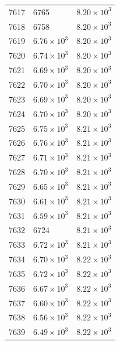 \begin{table}[H]
\begin{tabular}{lll}
7617 & 6765 & $\displaystyle 8.20 \times 10^{3}$ \\
7618 & 6758 & $\displaystyle 8.20 \times 10^{3}$ \\
7619 & $\displaystyle 6.76 \times 10^{3}$ & $\displaystyle 8.20 \times 10^{3}$ \\
7620 & $\displaystyle 6.74 \times 10^{3}$ & $\displaystyle 8.20 \times 10^{3}$ \\
7621 & $\displaystyle 6.69 \times 10^{3}$ & $\displaystyle 8.20 \times 10^{3}$ \\
7622 & $\displaystyle 6.70 \times 10^{3}$ & $\displaystyle 8.20 \times 10^{3}$ \\
7623 & $\displaystyle 6.69 \times 10^{3}$ & $\displaystyle 8.20 \times 10^{3}$ \\
7624 & $\displaystyle 6.70 \times 10^{3}$ & $\displaystyle 8.20 \times 10^{3}$ \\
7625 & $\displaystyle 6.75 \times 10^{3}$ & $\displaystyle 8.21 \times 10^{3}$ \\
7626 & $\displaystyle 6.76 \times 10^{3}$ & $\displaystyle 8.21 \times 10^{3}$ \\
7627 & $\displaystyle 6.71 \times 10^{3}$ & $\displaystyle 8.21 \times 10^{3}$ \\
7628 & $\displaystyle 6.70 \times 10^{3}$ & $\displaystyle 8.21 \times 10^{3}$ \\
7629 & $\displaystyle 6.65 \times 10^{3}$ & $\displaystyle 8.21 \times 10^{3}$ \\
7630 & $\displaystyle 6.61 \times 10^{3}$ & $\displaystyle 8.21 \times 10^{3}$ \\
7631 & $\displaystyle 6.59 \times 10^{3}$ & $\displaystyle 8.21 \times 10^{3}$ \\
7632 & 6724 & $\displaystyle 8.21 \times 10^{3}$ \\
7633 & $\displaystyle 6.72 \times 10^{3}$ & $\displaystyle 8.21 \times 10^{3}$ \\
7634 & $\displaystyle 6.70 \times 10^{3}$ & $\displaystyle 8.22 \times 10^{3}$ \\
7635 & $\displaystyle 6.72 \times 10^{3}$ & $\displaystyle 8.22 \times 10^{3}$ \\
7636 & $\displaystyle 6.67 \times 10^{3}$ & $\displaystyle 8.22 \times 10^{3}$ \\
7637 & $\displaystyle 6.60 \times 10^{3}$ & $\displaystyle 8.22 \times 10^{3}$ \\
7638 & $\displaystyle 6.56 \times 10^{3}$ & $\displaystyle 8.22 \times 10^{3}$ \\
7639 & $\displaystyle 6.49 \times 10^{3}$ & $\displaystyle 8.22 \times 10^{3}$ \\

\end{tabular}
\end{table}

